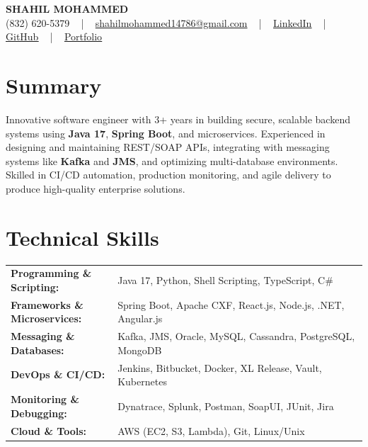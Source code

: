 \documentclass[letterpaper,11pt]{article}
\begin{document}
\begin{center}
    {\fontsize{14pt}{12pt}\selectfont \textbf{\MakeUppercase{Shahil Mohammed}}}\\ \vspace{2pt}
    \fontsize{10pt}{12pt}\selectfont (832) 620-5379 ~ | ~ \href{mailto:shahilmohammed14786@gmail.com}{shahilmohammed14786@gmail.com} ~ | ~  
    \href{https://www.linkedin.com/in/shahil-mohammed-9652931a1/}{\color{blue}\underline{LinkedIn}}  ~ | ~ 
    \href{https://github.com/freakbeast14}{\color{blue}\underline{GitHub}} ~ | ~ 
    \href{https://shahil-mohammed.netlify.app/}{\color{blue}\underline{Portfolio}}
    \vspace{-8pt}
\end{center}

\section{Summary}
\fontsize{9pt}{10pt}\selectfont
Innovative software engineer with 3+ years in building secure, scalable backend systems using \textbf{Java 17}, \textbf{Spring Boot}, and microservices. Experienced in designing and maintaining REST/SOAP APIs, integrating with messaging systems like \textbf{Kafka} and \textbf{JMS}, and optimizing multi-database environments. Skilled in CI/CD automation, production monitoring, and agile delivery to produce high-quality enterprise solutions.
 \vspace{-5pt}
 
\section{Technical Skills}
        \vspace{-14pt}
        \begin{table}[h]
            \fontsize{9pt}{10pt}\selectfont
            \begin{tabular}{p{0.3\linewidth} p{0.7\linewidth}}
                \textbf{Programming \& Scripting:} & Java 17, Python, Shell Scripting, TypeScript, C\# \\
                \textbf{Frameworks \& Microservices:} & Spring Boot, Apache CXF, React.js, Node.js, .NET, Angular.js \\
                \textbf{Messaging \& Databases:} & Kafka, JMS, Oracle, MySQL, Cassandra, PostgreSQL, MongoDB \\
                \textbf{DevOps \& CI/CD:} & Jenkins, Bitbucket, Docker, XL Release, Vault, Kubernetes \\
                \textbf{Monitoring \& Debugging:} & Dynatrace, Splunk, Postman, SoapUI, JUnit, Jira \\
                \textbf{Cloud \& Tools:} & AWS (EC2, S3, Lambda), Git, Linux/Unix \\
            \end{tabular}
        \end{table}
 \vspace{-15pt}
 
\end{document}
